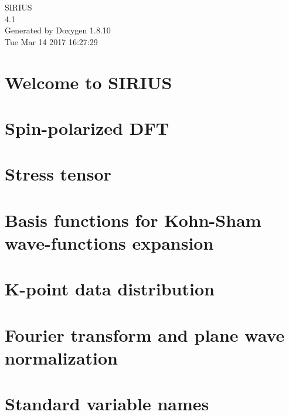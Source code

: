 \documentclass[twoside]{book}
\newcommand{\+}{\discretionary{\mbox{\scriptsize$\hookleftarrow$}}{}{}}
\newcommand{\clearemptydoublepage}{%
  \newpage{\pagestyle{empty}\cleardoublepage}%
}
\begin{document}
\hypersetup{pageanchor=false,
             bookmarks=true,
             bookmarksnumbered=true,
             pdfencoding=unicode
            }
\begin{titlepage}
\vspace*{7cm}
\begin{center}%
{\Large S\+I\+R\+I\+U\+S \\[1ex]\large 4.\+1 }\\
\vspace*{1cm}
{\large Generated by Doxygen 1.8.10}\\
\vspace*{0.5cm}
{\small Tue Mar 14 2017 16:27:29}\\
\end{center}
\end{titlepage}
\clearemptydoublepage
\tableofcontents
\clearemptydoublepage
{}
\hypersetup{pageanchor=true}

\chapter{Welcome to S\+I\+R\+I\+U\+S}
\label{index}\hypertarget{index}{}
\chapter{Spin-\/polarized D\+F\+T}
\label{_d_f_t}
\hypertarget{_d_f_t}{}

\chapter{Stress tensor}
\label{stress}
\hypertarget{stress}{}

\chapter{Basis functions for Kohn-\/\+Sham wave-\/functions expansion}
\label{basis}
\hypertarget{basis}{}

\chapter{K-\/point data distribution}
\label{data_dist}
\hypertarget{data_dist}{}

\chapter{Fourier transform and plane wave normalization}
\label{ft_pw}
\hypertarget{ft_pw}{}

\chapter{Standard variable names}
\label{stdvarname}
\hypertarget{stdvarname}{}

\end{document}
